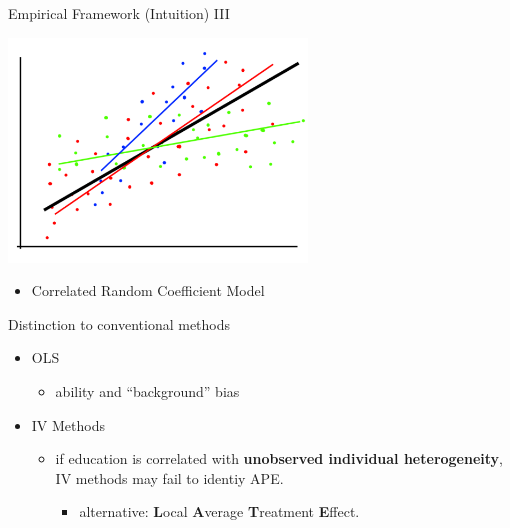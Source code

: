 \documentclass[10pt,ignorenonframetext,]{beamer}
\providecommand{\tightlist}{%
  \setlength{\itemsep}{0pt}\setlength{\parskip}{0pt}}
\begin{document}
\begin{frame}{Empirical Framework (Intuition) III}
\protect\hypertarget{empirical-framework-intuition-iii}{}

\includegraphics[width=3.125in,height=\textheight]{img/rcmodel003.png}

\begin{itemize}
\tightlist
\item
  Correlated Random Coefficient Model
\end{itemize}

\end{frame}

\begin{frame}{Distinction to conventional methods}
\protect\hypertarget{distinction-to-conventional-methods}{}

\begin{itemize}
\tightlist
\item
  OLS

  \begin{itemize}
  \tightlist
  \item
    ability and ``background'' bias
  \end{itemize}
\item
  IV Methods

  \begin{itemize}
  \tightlist
  \item
    if education is correlated with \textbf{unobserved individual
    heterogeneity}, IV methods may fail to identiy APE.

    \begin{itemize}
    \tightlist
    \item
      alternative: \textbf{L}ocal \textbf{A}verage \textbf{T}reatment
      \textbf{E}ffect.
    \end{itemize}
  \end{itemize}
\end{itemize}

\end{frame}
\end{document}
